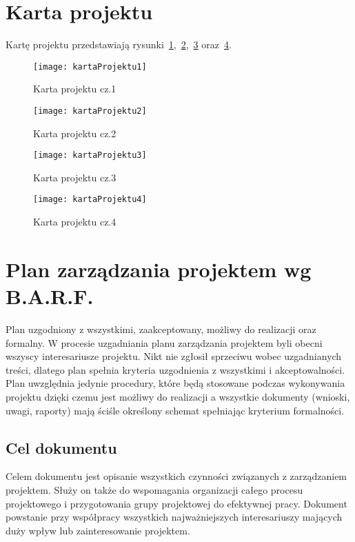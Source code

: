 
\section{Karta projektu}
Kartę projektu przedstawiają rysunki~\ref{kartaProjektu1},~\ref{kartaProjektu2},~\ref{kartaProjektu3} oraz~\ref{kartaProjektu4}.
\begin{figure}[!h]
\centering
\texttt{[image: kartaProjektu1]}
\caption{Karta projektu cz.1}
\label{kartaProjektu1}
\end{figure}

\begin{figure}[!h]
\centering
\texttt{[image: kartaProjektu2]}
\caption{Karta projektu cz.2}
\label{kartaProjektu2}
\end{figure}

\begin{figure}[!h]
\centering
\texttt{[image: kartaProjektu3]}
\caption{Karta projektu cz.3}
\label{kartaProjektu3}
\end{figure}

\begin{figure}[!h]
\centering
\texttt{[image: kartaProjektu4]}
\caption{Karta projektu cz.4}
\label{kartaProjektu4}
\end{figure}


\section{Plan zarządzania projektem wg B.A.R.F.}

Plan uzgodniony z wszystkimi, zaakceptowany, możliwy do realizacji oraz formalny. W procesie uzgadniania planu zarządzania projektem byli obecni wszyscy interesariusze projektu. Nikt nie zgłosił sprzeciwu wobec uzgadnianych treści, dlatego plan spełnia kryteria uzgodnienia z wszystkimi i akceptowalności. Plan uwzględnia jedynie procedury, które będą stosowane podczas wykonywania projektu dzięki czemu jest możliwy do realizacji a wszystkie dokumenty (wnioski, uwagi, raporty) mają ściśle określony schemat spełniając kryterium formalności.

\subsection*{Cel dokumentu}
Celem dokumentu jest opisanie wszystkich czynności związanych z zarządzaniem projektem. Służy on także do wspomagania organizacji całego procesu projektowego i przygotowania grupy projektowej do efektywnej pracy. Dokument powstanie przy współpracy wszystkich najważniejszych interesariuszy mających duży wpływ lub zainteresowanie projektem.

